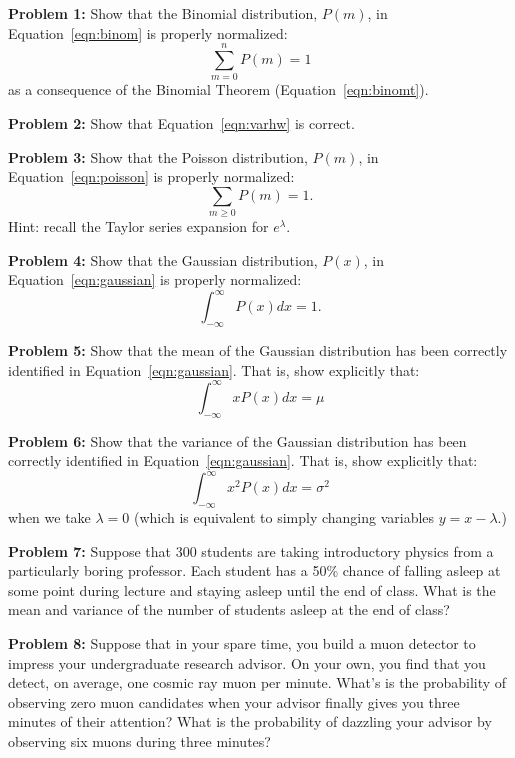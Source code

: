 \documentclass[12pt,oneside]{book}
\begin{document}
\noindent
{\bf Problem 1:} Show that the Binomial distribution, $P(m)$, in Equation~\ref{eqn:binom} is properly normalized:
\begin{displaymath}
\sum_{m=0}^n P(m) = 1
\end{displaymath}
as a consequence of the Binomial Theorem (Equation~\ref{eqn:binomt}).

\vskip 1cm
\noindent
{\bf Problem 2:} Show that Equation~\ref{eqn:varhw} is correct.

\vskip 1cm
\noindent
{\bf Problem 3:} Show that the Poisson distribution, $P(m)$, in Equation~\ref{eqn:poisson} is properly normalized:
\begin{displaymath}
\sum_{m \geq 0} P(m) = 1.
\end{displaymath}
Hint: recall the Taylor series expansion for $e^\lambda$.

\vskip 1cm
\noindent
{\bf Problem 4:} Show that the Gaussian distribution, $P(x)$, in Equation~\ref{eqn:gaussian} is properly normalized:
\begin{displaymath}
\int_{-\infty}^{\infty} P(x) dx = 1.
\end{displaymath}

\vskip 1cm
\noindent
{\bf Problem 5:} Show that the mean of the Gaussian distribution has been correctly identified in Equation~\ref{eqn:gaussian}.  That is, show explicitly that:
\begin{displaymath}
\int_{-\infty}^{\infty} x P(x) dx = \mu 
\end{displaymath}

\vskip 1cm
\noindent
{\bf Problem 6:} Show that the variance of the Gaussian distribution has been correctly identified in Equation~\ref{eqn:gaussian}.  That is, show explicitly that:
\begin{displaymath}
\int_{-\infty}^{\infty} x^2 P(x) dx = \sigma^2 
\end{displaymath}
when we take $\lambda=0$ (which is equivalent to simply changing variables $y=x-\lambda$.)

\vskip 1cm
\noindent
{\bf Problem 7:}
Suppose that 300 students are taking introductory physics from a particularly boring professor.  Each student has a 50\% chance of falling asleep at some point during lecture and staying asleep until the end of class.  What is the mean and variance of the number of students asleep at the end of class?

\vskip 1cm
\noindent
{\bf Problem 8:}
Suppose that in your spare time, you build a muon detector to impress your undergraduate research advisor.  On your own, you find that you detect, on average, one cosmic ray muon per minute.  What's is the probability of observing zero muon candidates when your advisor finally gives you three minutes of their attention?  What is the probability of dazzling your advisor by observing six muons during three minutes?
\end{document}
